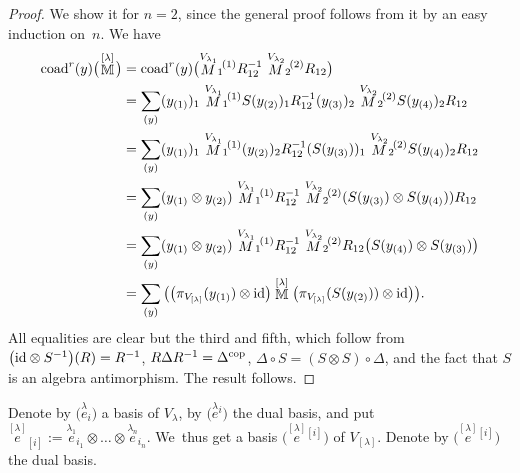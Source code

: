 \documentclass[pdftex]{sigma}%
\numberwithin{equation}{section}
\numberwithin{figure}{section}
\begin{document}
\begin{proof} We show it for $n=2$, since the general proof follows from it by an easy induction on~$n$. We have
\begin{align*}
\operatorname{coad}^r(y)\big(\!\stackrel{[\lambda]}{\mathbb M}\!\big)&=
\operatorname{coad}^r(y)\big(\!\!\stackrel{V_{\lambda_1}}{M}_1{}^{\!\!\! (1)}R_{12}^{-1}\stackrel{V_{\lambda_2}}{M}_2{}^{\!\!\! (2)}R_{12}\big)
\\
&=\sum_{(y)}(y_{(1)})_1\stackrel{V_{\lambda_1}}{M}_1{}^{\!\!\! (1)} S(y_{(2)})_1R_{12}^{-1}(y_{(3)})_2\stackrel{V_{\lambda_2}}{M}_2{}^{\!\!\! (2)} S(y_{(4)})_2R_{12}
\\
&=\sum_{(y)}(y_{(1)})_1\stackrel{V_{\lambda_1}}{M}_1{}^{\!\!\! (1)}(y_{(2)})_2 R_{12}^{-1}( S(y_{(3)}))_1\stackrel{V_{\lambda_2}}{M}_2{}^{\!\!\! (2)}
S(y_{(4)})_2R_{12}
\\
&=\sum_{(y)}(y_{(1)}\otimes y_{(2)}) \stackrel{V_{\lambda_1}}{M}_1{}^{\!\!\! (1)}R_{12}^{-1}\stackrel{V_{\lambda_2}}{M}_2{}^{\!\!\! (2)}( S(y_{(3)}) \otimes S(y_{(4)}))R_{12}
\\
&=\sum_{(y)}(y_{(1)}\otimes y_{(2)})\stackrel{V_{\lambda_1}}{M}_1{}^{\!\!\! (1)}R_{12}^{-1}\stackrel{V_{\lambda_2}}{M}_2{}^{\!\!\! (2)}R_{12}
\big( S(y_{(4)}) \otimes S(y_{(3)})\big)
\\
&=\sum_{(y)}\big(\big(\pi_{V_{[\lambda]}}(y_{(1)}) \otimes {\rm id} \big)
\stackrel{[\lambda]}{{\mathbb M}}\big(\pi_{V_{[\lambda]}}( S(y_{(2)})) \otimes {\rm id} \big)\big).
\end{align*}
All equalities are clear but the third and fifth, which follow from $\big({\rm id} \otimes S^{-1}\big)(R) = R^{-1}$, $R \Delta R^{-1} = \Delta^{\rm cop}$, $ \Delta \circ S = ( S \otimes S) \circ \Delta$, and the fact that $S$ is an algebra antimorphism. The result follows. \end{proof}

Denote by $\big(\!\stackrel{\lambda}{e}_i\!\big)$ a basis of $V_{\lambda}$, by $\big(\!\stackrel{\lambda}{e}{}^{\!\! i}\big)$ the dual basis, and put $\stackrel{[\lambda]}{e}_{[i]} := \stackrel{\lambda_1}{e}_{i_1}\otimes \dots \otimes \stackrel{\lambda_n}{e}_{i_n}$. We~thus get a basis $\big(\!\stackrel{[\lambda]}{e}{}^{\!\! [i]}\big)$ of $V_{[\lambda]}$. Denote by $\big(\!\stackrel{[\lambda]}{e}{}^{\!\! [i]}\big)$ the dual basis.
\end{document}

